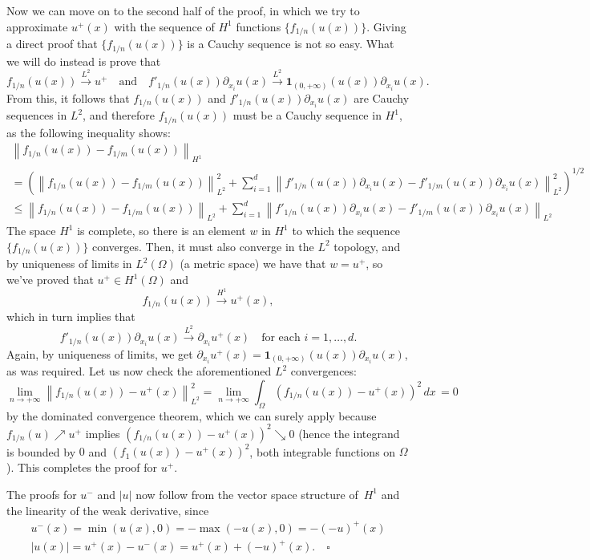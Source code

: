 \documentclass[a4paper]{article}
\newcommand{\abs}[1]{\left\lvert#1\right\rvert}
\newcommand{\dx}{\, dx \,}
\newcommand{\normltwo}[1]{\left\lVert#1\right\rVert_{L^2}}
\newcommand{\normhone}[1]{\left\lVert#1\right\rVert_{H^1}}
\begin{document}
\begin{description}
	Now we can move on to the second half of the proof, in which we try
	to approximate $u^+(x)$ with the sequence of $H^1$ functions $\{f_{1/n}(u(x))\}$.
	Giving a direct proof that $\{f_{1/n}(u(x))\}$ is a Cauchy sequence is not so easy.
	What we will do instead is prove that
	\[
	f_{1/n}(u(x)) \xrightarrow{L^2} u^+ \quad \text{and}	\quad
	f'_{1/n}(u(x)) \partial_{x_i} u(x) \xrightarrow{L^2}
	\textbf{1}_{(0,+\infty)}(u(x)) \partial_{x_i} u(x).
	\]
	From this, it follows that $f_{1/n}(u(x))$ and $f'_{1/n}(u(x)) \partial_{x_i} u(x)$
	are Cauchy sequences in $L^2$, and therefore $f_{1/n}(u(x))$
	must be a Cauchy sequence in $H^1$, as the following inequality shows:
	\begin{gather*}
	\normhone{ f_{1/n}(u(x))-f_{1/m}(u(x)) } \\
	= \left( \normltwo{ f_{1/n}(u(x))-f_{1/m}(u(x)) }^2
	+ \sum_{i=1}^d \normltwo{ f'_{1/n}(u(x)) \partial_{x_i} u(x)
	- f'_{1/m}(u(x)) \partial_{x_i} u(x)}^2 \right)^{1/2} \\
	\leq \normltwo{ f_{1/n}(u(x))-f_{1/m}(u(x)) }
	+ \sum_{i=1}^d \normltwo{ f'_{1/n}(u(x)) \partial_{x_i} u(x)
	- f'_{1/m}(u(x)) \partial_{x_i} u(x)}
	\end{gather*}
	The space $H^1$ is complete, so there is an element $w$ in $H^1$ to which
	the sequence $\{f_{1/n}(u(x))\}$ converges.
	Then, it must also converge in the $L^2$ topology,
	and by uniqueness of limits in $L^2(\Omega)$ (a metric space) we have that
	$w = u^+$, so we've proved that $u^+ \in H^1(\Omega)$ and
	\[
	f_{1/n}(u(x)) \xrightarrow{H^1} u^+(x),
	\]
	which in turn implies that 
	\[
	f'_{1/n}(u(x)) \partial_{x_i} u(x) \xrightarrow{L^2} \partial_{x_i}u^+(x)
	\quad \text{for each $i = 1,\dots,d$.}
	\]
	Again, by uniqueness of limits, we get
	$\partial_{x_i}u^+(x) = \textbf{1}_{(0,+\infty)}(u(x)) \partial_{x_i} u(x)$,
	as was required.
	Let us now check the aforementioned $L^2$ convergences:
	\begin{equation*}
	\lim_{n \to +\infty} \normltwo{f_{1/n}(u(x)) - u^+(x)}^2
	= \lim_{n \to +\infty} \int_\Omega \left( f_{1/n}(u(x)) - u^+(x) \right)^2 \dx
	= 0
	\end{equation*}
	by the dominated convergence theorem, which we can surely apply because
	$f_{1/n}(u) \nearrow u^+$ implies
	$\left( f_{1/n}(u(x)) - u^+(x) \right)^2 \searrow 0$
	(hence the integrand is bounded by $0$ and $\left( f_1(u(x)) - u^+(x) \right)^2$,
	both integrable functions on $\Omega$). This completes the proof for $u^+$.
	
	The proofs for $u^-$ and $\abs{u}$ now follow from the vector
	space structure of~$H^1$ and the linearity of the weak derivative, since
	\begin{gather*}
	u^-(x) = \min(u(x),0) = -\max(-u(x),0) = -(-u)^+(x) \\
	\abs{u(x)} = u^+(x) - u^-(x) = u^+(x) + (-u)^+(x). \quad \square
	\end{gather*}
\end{description}
\end{document}
